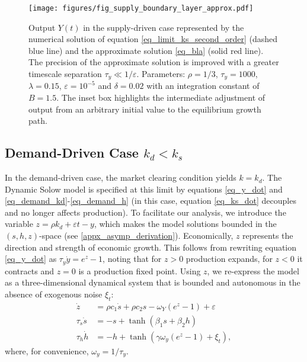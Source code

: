 \documentclass[authoryear, review]{elsarticle}
\begin{document}
\begin{figure}[H]
    \centering
    \texttt{[image: figures/fig\_supply\_boundary\_layer\_approx.pdf]}
    \caption{Output $Y(t)$ in the supply-driven case represented by the numerical solution of equation \eqref{eq_limit_ks_second_order} (dashed blue line) and the approximate solution \eqref{eq_bla} (solid red line). The precision of the approximate solution is improved with a greater timescale separation $\tau_y\ll1/\varepsilon$. Parameters: $\rho=1/3$, $\tau_y=1000$, $\lambda=0.15$, $\varepsilon=10^{-5}$ and $\delta=0.02$ with an integration constant of $B=1.5$. The inset box highlights the intermediate adjustment of output from an arbitrary initial value to the equilibrium growth path.}
    \label{fig_limitks}
\end{figure}

\subsection{Demand-Driven Case $k_d<k_s$}\label{sec_kd_limit}
In the demand-driven case, the market clearing condition yields $k=k_d$. The Dynamic Solow model is specified at this limit by equations \eqref{eq_y_dot} and \eqref{eq_demand_kd}-\eqref{eq_demand_h} (in this case, equation \ref{eq_ks_dot} decouples and no longer affects production). To facilitate our analysis, we introduce the variable $z=\rho k_d + \varepsilon t - y$, which makes the model solutions bounded in the $(s,h,z)$-space (see \ref{appx_asymp_derivation}). Economically, $z$ represents the direction and strength of economic growth. This follows from rewriting equation \eqref{eq_y_dot} as $\tau_y\dot{y}=e^z-1$, noting that for $z>0$ production expands, for $z<0$ it contracts and $z=0$ is a production fixed point. Using $z$, we re-express the model as a three-dimensional dynamical system that is bounded and autonomous in the absence of exogenous noise $\xi_t$:
\begin{subequations}\label{eq_kd_shz_system}
\begin{align}
\dot{z} &= \rho c_1 \dot{s} + \rho c_2 s - \omega_Y \left(e^{z}-1\right)+\varepsilon\label{eq_z_z_dot}\\
\tau_s \dot{s} &= -s + \tanh\left(\beta_1 s + \beta_2 h \right)\label{eq_z_s_dot}\\
\tau_h \dot{h} &= -h + \tanh\left(\gamma\omega_y\left(e^{z}-1\right) +\xi_t \right)\label{eq_z_h_dot},
\end{align}
\end{subequations}
where, for convenience, $\omega_y = 1/\tau_y$. %
\end{document}
